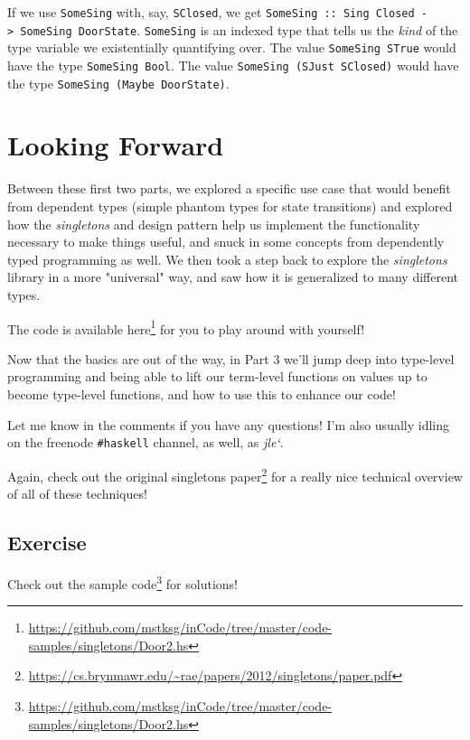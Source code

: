 \documentclass[]{article}
\renewcommand{\href}[2]{#2\footnote{\url{#1}}}
\begin{document}
If we use \texttt{SomeSing} with, say, \texttt{SClosed}, we get
\texttt{SomeSing\ ::\ Sing\ \textquotesingle{}Closed\ -\textgreater{}\ SomeSing\ DoorState}.
\texttt{SomeSing} is an indexed type that tells us the \emph{kind} of the type
variable we existentially quantifying over. The value \texttt{SomeSing\ STrue}
would have the type \texttt{SomeSing\ Bool}. The value
\texttt{SomeSing\ (SJust\ SClosed)} would have the type
\texttt{SomeSing\ (Maybe\ DoorState)}.

\section{Looking Forward}

Between these first two parts, we explored a specific use case that would
benefit from dependent types (simple phantom types for state transitions) and
explored how the \emph{singletons} and design pattern help us implement the
functionality necessary to make things useful, and snuck in some concepts from
dependently typed programming as well. We then took a step back to explore the
\emph{singletons} library in a more "universal" way, and saw how it is
generalized to many different types.

The code is available
\href{https://github.com/mstksg/inCode/tree/master/code-samples/singletons/Door2.hs}{here}
for you to play around with yourself!

Now that the basics are out of the way, in Part 3 we'll jump deep into
type-level programming and being able to lift our term-level functions on values
up to become type-level functions, and how to use this to enhance our code!

Let me know in the comments if you have any questions! I'm also usually idling
on the freenode \texttt{\#haskell} channel, as well, as \emph{jle`}.

Again, check out the
\href{https://cs.brynmawr.edu/~rae/papers/2012/singletons/paper.pdf}{original
singletons paper} for a really nice technical overview of all of these
techniques!

\subsection{Exercise}

Check out the
\href{https://github.com/mstksg/inCode/tree/master/code-samples/singletons/Door2.hs}{sample
code} for solutions!
\end{document}
